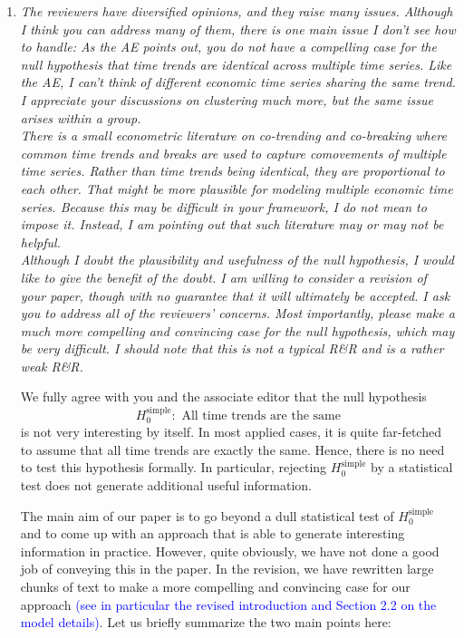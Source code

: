 \documentclass[a4paper,12pt]{article}
\begin{document}
\begin{enumerate}[label=\arabic*.,leftmargin=0.6cm]


\item \textit{The reviewers have diversified opinions, and they raise many issues. Although I think you can address many of them, there is one main issue I don’t see how to handle: As the AE points out, you do not have a compelling case for the null hypothesis that time trends are identical across multiple time series. Like the AE, I can’t think of different economic time series sharing the same trend.  I appreciate your discussions on clustering much more, but the same issue arises within a group. \\
There is a small econometric literature on co-trending and co-breaking where common time trends and breaks are used to capture comovements of multiple time series. Rather than time trends being identical, they are proportional to each other. That might be more plausible for modeling multiple economic time series. Because this may be difficult in your framework, I do not mean to impose it.  Instead, I am pointing out that such literature may or may not be helpful. \\
Although I doubt the plausibility and usefulness of the null hypothesis, I would like to give the benefit of the doubt. I am willing to consider a revision of your paper, though with no guarantee that it will ultimately be accepted. I ask you to address all of the reviewers' concerns. Most importantly, please make a much more compelling and convincing case for the null hypothesis, which may be very difficult. I should note that this is not a typical R\&R and is a rather weak R\&R.
}

We fully agree with you and the associate editor that the null hypothesis
\[ H_0^{\text{simple}}: \text{ All time trends are the same} \]
is not very interesting by itself. In most applied cases, it is quite far-fetched to assume that all time trends are exactly the same. Hence, there is no need to test this hypothesis formally. In particular, rejecting $H_0^{\text{simple}}$ by a statistical test does not generate additional useful information.

The main aim of our paper is to go beyond a dull statistical test of $H_0^{\text{simple}}$ and to come up with an approach that is able to generate interesting information in practice. However, quite obviously, we have not done a good job of conveying this in the paper. In the revision, we have rewritten large chunks of text to make a more compelling and convincing case for our approach \textcolor{blue}{(see in particular the revised introduction and Section 2.2 on the model details)}. Let us briefly summarize the two main points here: 
\begin{enumerate}[leftmargin=0.7cm]


\end{enumerate}
\end{enumerate}
\end{document}
